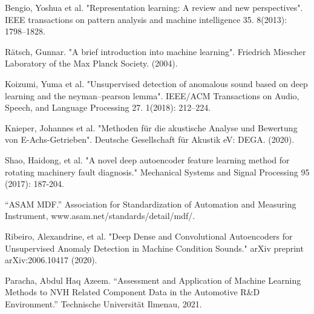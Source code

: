 \documentclass[a4paper, 10pt, twocolumn]{article}
\begin{document}
\begin{thebibliography}{8}
Bengio, Yoshua et al. "Representation learning: A review and new perspectives". IEEE transactions on pattern analysis and machine intelligence 35. 8(2013): 1798–1828.

Rätsch, Gunnar. "A brief introduction into machine learning". Friedrich Miescher Laboratory of the Max Planck Society. (2004).

Koizumi, Yuma et al. "Unsupervised detection of anomalous sound based on deep learning and the neyman–pearson lemma". IEEE/ACM Transactions on Audio, Speech, and Language Processing 27. 1(2018): 212–224.


Knieper, Johannes et al. "Methoden für die akustische Analyse und Bewertung von E-Achs-Getrieben". Deutsche Gesellschaft für Akustik eV: DEGA. (2020).




Shao, Haidong, et al. "A novel deep autoencoder feature learning method for rotating machinery fault diagnosis." Mechanical Systems and Signal Processing 95 (2017): 187-204.




“ASAM MDF.” Association for Standardization of Automation and Measuring Instrument, www.asam.net/standards/detail/mdf/. 

Ribeiro, Alexandrine, et al. "Deep Dense and Convolutional Autoencoders for Unsupervised Anomaly Detection in Machine Condition Sounds." arXiv preprint arXiv:2006.10417 (2020).

Paracha, Abdul Haq Azeem. “Assessment and Application of Machine
Learning Methods to NVH Related Component
Data in the Automotive R\&D Environment.” Technische Universität Ilmenau, 2021. 

\end{thebibliography}
\end{document}
